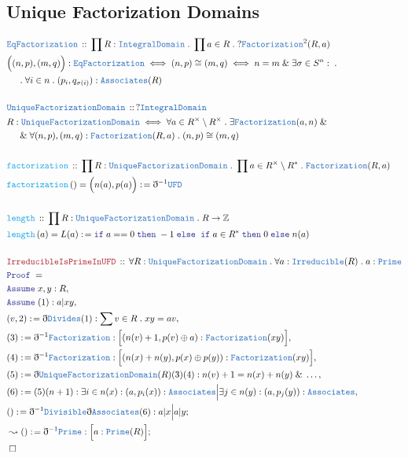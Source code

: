 \documentclass[12pt]{scrartcl}
\newcommand{\TYPE}[1]{\textcolor{NavyBlue}{\mathtt{#1}}}
\newcommand{\FUNC}[1]{\textcolor{Cerulean}{\mathtt{#1}}}
\newcommand{\LOGIC}[1]{\textcolor{Blue}{\mathtt{#1}}}
\newcommand{\THM}[1]{\textcolor{Maroon}{\mathtt{#1}}}
\renewcommand{\.}{\; . \;}
\newcommand{\de}{: \kern 0.1pc =}
\newcommand{\If}{\LOGIC{if} \;}
\newcommand{\Then}{ \; \LOGIC{then} \;}
\newcommand{\Else}{\; \LOGIC{else} \;}
\newcommand{\Act}[1]{\left( #1 \right)}
\newcommand{\Theorem}[2]{& \THM{#1} \, :: \, #2 \\ & \Proof = \\ }
\newcommand{\DeclareType}[2]{& \TYPE{#1} \, :: \, #2 \\}
\newcommand{\DefineType}[3]{& #1 : \TYPE{#2} \iff #3 \\}
\newcommand{\DefineNamedType}[4]{& #1 : \TYPE{#2} \iff #3 \iff #4 \\}
\newcommand{\DeclareFunc}[2]{& \FUNC{#1} \, :: \, #2 \\}
\newcommand{\DefineNamedFunc}[4]{&  \FUNC{#1}\Act{#2} = #3 \de #4 \\}
\newcommand{\NewLine}{\\ & \kern 1pc}
\newcommand{\Page}[1]{ \begin{align*} #1 \end{align*}   }
\newcommand{ \bd }{ \ByDef }
\renewcommand{\And}{\; \& \;}
\newcommand{\Int}{\mathbb{Z} }
\newcommand{\Say}[3]{& #1 \de #2 : #3, \\}
\newcommand{\Conclude}[3]{& #1 \de #2 : #3; \\}
\newcommand{\DeriveConclude}[3]{& \leadsto #1 \de #2 : #3 ; \\}
\newcommand{\Assume}[2]{& \LOGIC{Assume} \; #1 : #2, \\}
\newcommand{\QED}{\; \square}
\newcommand{\EndProof}{& \QED \\}
\newcommand{\ByDef}{\eth}
\newcommand{\Proof}{\LOGIC{Proof} \; }
\newcommand{\ID}{\TYPE{IntegralDomain}}
\newcommand{\UFD}{\TYPE{UniqueFactorizationDomain}}
\begin{document}
\subsection{Unique Factorization Domains}
\Page{
	\DeclareType{EqFactorization}{\prod R :  \ID \. \prod a \in R \. ?\TYPE{Factorization}^2(R,a)}
	\DefineNamedType{\Big((n,p),(m,q)\Big)}{EqFactorization}{(n,p) \cong (m,q)}{ n = m \And \exists \sigma \in S^n : \. 
		\NewLine \. \forall i \in n \. (p_i,q_{\sigma(i)}) : \TYPE{Associates}(R)}
	\\
	\DeclareType{UniqueFactorizationDomain}{?\ID}
	\DefineType{R}{\UFD}{\forall a \in R^\times \setminus R^\times \. \exists \TYPE{Factorization}(a,n) \And  \NewLine \And \forall (n,p),(m,q) : \TYPE{Factorization}(R,a) \. (n,p) \cong (m,q) }
	\\
	\DeclareFunc{factorization}{\prod R : \UFD \. \prod a \in R^\times \setminus R^*  \. \TYPE{Factorization}(R,a)}
	\DefineNamedFunc{factorization}{   }{\Big(n(a),p(a)\Big)}{ \bd^{-1} \TYPE{UFD} }
	\\
	\DeclareFunc{length}{ \prod R : \UFD \. R \to \Int }
	\DefineNamedFunc{length}{a}{L(a)}{ \If a == 0 \Then -1 \Else \; \If a \in R^* \Then 0 \Else n(a)}
	\\
	\Theorem{IrreducibleIsPrimeInUFD}{ \forall R : \UFD \.  \forall a : \TYPE{Irreducible}(R) \. a : \TYPE{Prime} }
	\Assume{x,y}{R}
	\Assume{(1)}{ a | xy  }
	\Say{(v,2)}{\bd \TYPE{Divides}(1)}{ \sum v \in R \. xy = av}
	\Say{(3)}{\bd^{-1} \TYPE{Factorization}}{ \Big[ (n(v) + 1, p(v) \oplus a) : \TYPE{Factorization}(xy) \Big] }
	\Say{(4)}{\bd^{-1} \TYPE{Factorization}}{ \Big[(n(x) + n(y), p(x) \oplus p(y)) : \TYPE{Factorization}(xy) \Big]  }
	\Say{(5)}{\bd \UFD(R)(3)(4)  }{  n(v) + 1 = n(x) + n(y) \And \ldots}
	\Say{(6)}{ (5)(n + 1)  }{  \exists i \in n(x) : (a,p_i(x)) : \TYPE{Associates} \Big| \exists j \in n(y) : (a,p_j(y)) : \TYPE{Associates}  }
	\Conclude{()}{ \bd^{-1} \TYPE{Divisible} \bd \TYPE{Associates}(6)  }{ a | x \Big| a | y  }
	\DeriveConclude{()}{ \bd^{-1} \TYPE{Prime} }{ \Big[ a : \TYPE{Prime}(R) \Big]}
	\EndProof
}
\end{document}
